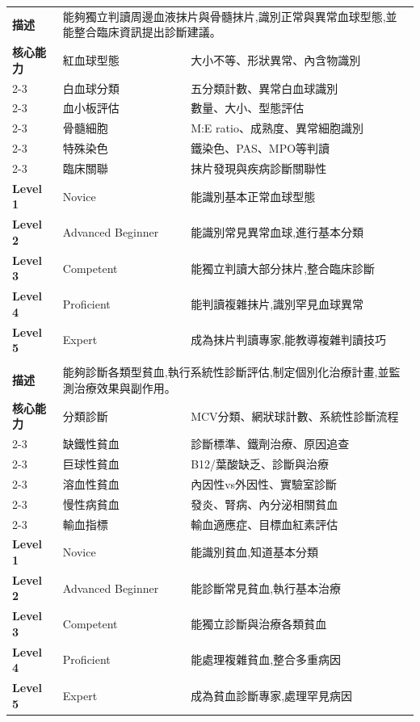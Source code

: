 \documentclass[12pt,a4paper]{article}
\begin{document}
\begin{longtable}{|p{1.2cm}|p{3.8cm}|p{8.5cm}|}
\rowcolor{heme_red!10}
\multicolumn{3}{|c|}{\textbf{EPA 2: 周邊血液抹片與骨髓抹片判讀}} \\
\hline
\textbf{描述} & \multicolumn{2}{|p{12.5cm}|}{能夠獨立判讀周邊血液抹片與骨髓抹片,識別正常與異常血球型態,並能整合臨床資訊提出診斷建議。} \\
\hline
\textbf{核心能力} & 紅血球型態 & 大小不等、形狀異常、內含物識別 \\
\cline{2-3}
& 白血球分類 & 五分類計數、異常白血球識別 \\
\cline{2-3}
& 血小板評估 & 數量、大小、型態評估 \\
\cline{2-3}
& 骨髓細胞 & M:E ratio、成熟度、異常細胞識別 \\
\cline{2-3}
& 特殊染色 & 鐵染色、PAS、MPO等判讀 \\
\cline{2-3}
& 臨床關聯 & 抹片發現與疾病診斷關聯性 \\
\hline
\textbf{Level 1} & Novice & 能識別基本正常血球型態 \\
\hline
\textbf{Level 2} & Advanced Beginner & 能識別常見異常血球,進行基本分類 \\
\hline
\textbf{Level 3} & Competent & 能獨立判讀大部分抹片,整合臨床診斷 \\
\hline
\textbf{Level 4} & Proficient & 能判讀複雜抹片,識別罕見血球異常 \\
\hline
\textbf{Level 5} & Expert & 成為抹片判讀專家,能教導複雜判讀技巧 \\
\hline

\rowcolor{heme_red!10}
\multicolumn{3}{|c|}{\textbf{EPA 3: 貧血診斷與處理}} \\
\hline
\textbf{描述} & \multicolumn{2}{|p{12.5cm}|}{能夠診斷各類型貧血,執行系統性診斷評估,制定個別化治療計畫,並監測治療效果與副作用。} \\
\hline
\textbf{核心能力} & 分類診斷 & MCV分類、網狀球計數、系統性診斷流程 \\
\cline{2-3}
& 缺鐵性貧血 & 診斷標準、鐵劑治療、原因追查 \\
\cline{2-3}
& 巨球性貧血 & B12/葉酸缺乏、診斷與治療 \\
\cline{2-3}
& 溶血性貧血 & 內因性vs外因性、實驗室診斷 \\
\cline{2-3}
& 慢性病貧血 & 發炎、腎病、內分泌相關貧血 \\
\cline{2-3}
& 輸血指標 & 輸血適應症、目標血紅素評估 \\
\hline
\textbf{Level 1} & Novice & 能識別貧血,知道基本分類 \\
\hline
\textbf{Level 2} & Advanced Beginner & 能診斷常見貧血,執行基本治療 \\
\hline
\textbf{Level 3} & Competent & 能獨立診斷與治療各類貧血 \\
\hline
\textbf{Level 4} & Proficient & 能處理複雜貧血,整合多重病因 \\
\hline
\textbf{Level 5} & Expert & 成為貧血診斷專家,處理罕見病因 \\
\hline


\end{longtable}
\end{document}
